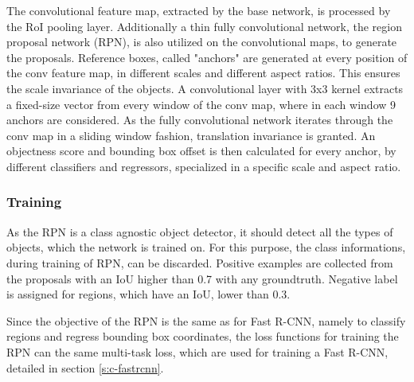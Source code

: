 The convolutional feature map, extracted by the base network, is processed by the RoI pooling layer. Additionally a thin fully convolutional network, the region proposal network (RPN), is also utilized on the convolutional maps, to generate the proposals. Reference boxes, called "anchors" are generated at every position of the conv feature map, in different scales and different aspect ratios. This ensures the scale invariance of the objects. A convolutional layer with 3x3 kernel extracts a fixed-size vector from every window of the conv map, where in each window 9 anchors are considered. As the fully convolutional network iterates through the conv map in a sliding window fashion, translation invariance is granted. An objectness score and bounding box offset is then calculated for every anchor, by different classifiers and regressors, specialized in a specific scale and aspect ratio.

\subsubsection{Training}

As the RPN is a class agnostic object detector, it should detect all the types of objects, which the network is trained on. For this purpose, the class informations, during training of RPN, can be discarded. Positive examples are collected from the proposals with an IoU higher than 0.7 with any groundtruth. Negative label is assigned for regions, which have an IoU, lower than 0.3.

Since the objective of the RPN is the same as for Fast R-CNN, namely to classify regions and regress bounding box coordinates, the loss functions for training the RPN can the same multi-task loss, which are used for training a Fast R-CNN, detailed in section \ref{s:c-fastrcnn}.